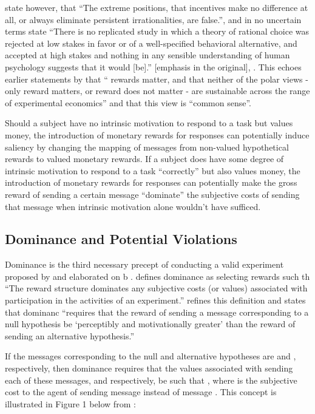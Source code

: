 \textcite[8]{Camerer1999} state however, that \enquote{The extreme positions, that  incentives make no difference at all, or always eliminate persistent irrationalities, are false.}, and in no uncertain terms state \enquote{There is no replicated study in which a theory of rational choice was rejected at low stakes in favor or of a well-specified behavioral alternative, and accepted at high stakes \textelp{} and nothing in any sensible understanding of human psychology suggests that it would [be].} [emphasis in the original], \parencite*[33-34]{Camerer1999}.
This echoes earlier statements by \textcite[246]{Smith1993} that \enquote{\textelp{} rewards matter, and that neither of the polar views - only reward matters, or reward does not matter - are sustainable across the range of experimental economics} and that this view is \enquote{common sense}.

Should a subject have no intrinsic motivation to respond to a task but values money, the introduction of monetary rewards for responses can potentially induce saliency by changing the mapping of messages from non-valued hypothetical rewards to valued monetary rewards.
If a subject does have some degree of intrinsic motivation to respond to a task \enquote{correctly} but also values money, the introduction of monetary rewards for responses can potentially make the gross reward of sending a certain message \enquote{dominate} the subjective costs of sending that message when intrinsic motivation alone wouldn't have sufficed.

\subsection{Dominance and Potential Violations}

Dominance is the third necessary precept of conducting a valid experiment proposed by \textcite{Smith1982} and elaborated on b \textcite{Harrison1989, Harrison1992}.
\textcite[934]{Smith1982} defines dominance as selecting rewards such th \enquote{The reward structure dominates any subjective costs (or values) associated with participation in the activities of an experiment.}
\textcite[1426]{Harrison1992} refines this definition and states that dominanc \enquote{requires that the reward of sending a message corresponding to a null hypothesis be \enquote{perceptibly and motivationally greater} than the reward of sending an alternative hypothesis.}

If the messages corresponding to the null and alternative hypotheses are  and , respectively, then dominance requires that the values associated with sending each of these messages,  and  respectively, be such that , where  is the subjective cost to the agent of sending message  instead of message \parencite[1427]{Harrison1992}.
This concept is illustrated in Figure 1 below from \textcite[1427]{Harrison1992}:



